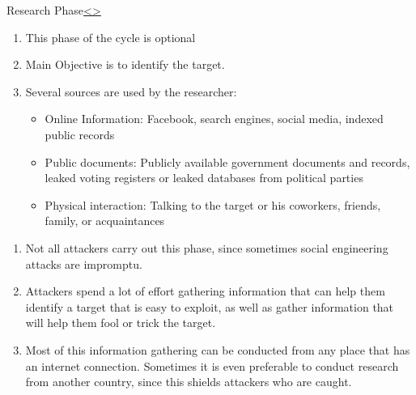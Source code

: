 \documentclass[12pt]{extarticle}
\newenvironment{instructionblock}{\Large\bgroup}{\egroup}
\begin{document}
\pagebreak
\begin{slide}{Research Phase}{\hyperref[slide 10]{\textless}\hyperref[slide 12]{\textgreater}}
	\begin{instructionblock}
		\begin{enumerate} 
			\item This phase of the cycle is optional
			\item Main Objective is to identify the target.
			\item Several sources are used by the researcher:
			\begin{itemize}
				\item Online Information: Facebook, search engines, social media, indexed public records
				\item Public documents: Publicly available government documents and records, leaked voting registers or leaked databases from political parties
				\item Physical interaction: Talking to the target or his coworkers, friends, family, or acquaintances 
			\end{itemize}
		\end{enumerate}
	\end{instructionblock}
\end{slide}
\begin{enumerate}
	\item Not all attackers carry out this phase, since sometimes social engineering attacks are impromptu.\cite{b2}
	\item Attackers spend a lot of effort gathering information that can help them identify a target that is easy to exploit, as well as gather information that will help them fool or trick the target.\cite{b2}
	\item Most of this information gathering can be conducted from any place that has an internet connection. Sometimes it is even preferable to conduct research from another country, since this shields attackers who are caught.\cite{b2}
\end{enumerate}
\end{document}
